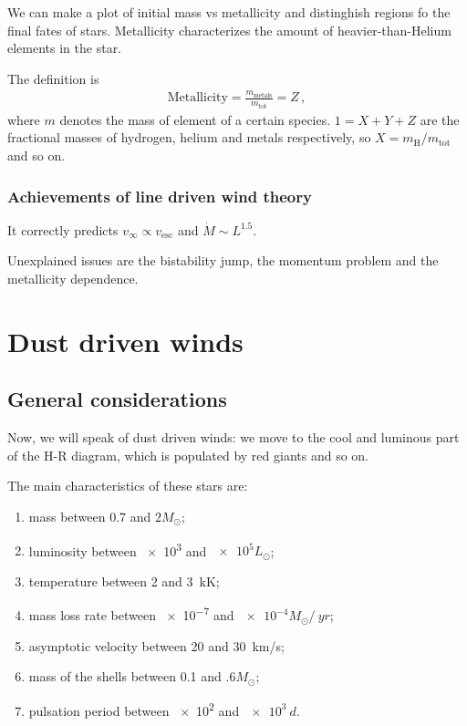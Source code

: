 \documentclass[main.tex]{subfiles}
\begin{document}
We can make a plot of initial mass vs metallicity and distinghish regions fo the final fates of stars. 
Metallicity characterizes the amount of heavier-than-Helium elements in the star. 

The definition is 
%
\begin{align}
  \text{Metallicity} = \frac{m_{\text{metals}}}{m_{\text{tot}}} = Z
\,,
\end{align}
%
where \(m\) denotes the mass of element of a certain species. \(1 = X + Y + Z\) are the fractional masses of hydrogen, helium and metals respectively, so \(X = m _{\text{H}}/ m _{\text{tot}}\) and so on. 

\subsubsection{Achievements of line driven wind theory}

It correctly predicts \(v_{ \infty } \propto v _{\text{esc}}\) and \(\dot{M} \sim L^{1.5}\).

Unexplained issues are the bistability jump, the momentum problem and the metallicity dependence.

\section{Dust driven winds}

\subsection{General considerations}

Now, we will speak of dust driven winds: we move to the cool and luminous part of the H-R diagram, which is populated by red giants and so on. 

The main characteristics of these stars are: 
\begin{enumerate}
  \item mass between \num{.7} and \(2 M_{\odot}\);
  \item luminosity between \num{e3} and \(\num{e5}L_{\odot}\);
  \item temperature between \num{2} and \SI{3}{\kilo\kelvin};
  \item mass loss rate between \num{e-7} and \(\num{e-4} M_{\odot} / \SI{}{yr}\);
  \item asymptotic velocity between \num{20} and \SI{30}{km/s};
  \item mass of the shells between \num{.1} and \(\num{.6}M_{\odot}\);
  \item pulsation period between \num{e2} and \(\SI{e3}{d}\).
\end{enumerate}
\end{document}
